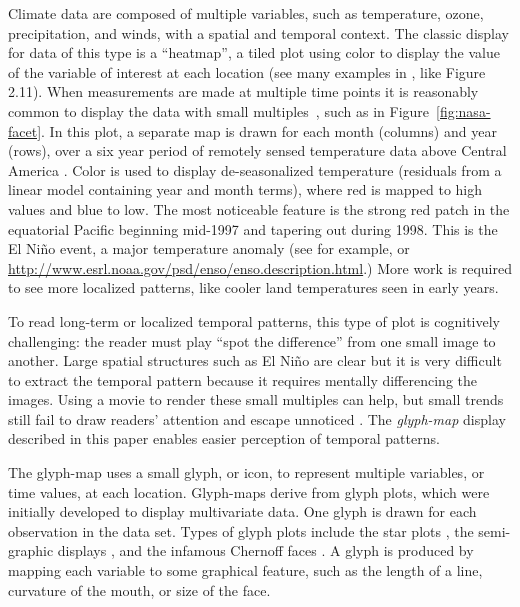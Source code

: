 \documentclass[oneside]{article}
\begin{document}
Climate data are composed of multiple variables, such as temperature, ozone, precipitation, and winds, with a spatial and temporal context. The classic display for data of this type is a ``heatmap'', a tiled plot using color to display the value of the variable of interest at each location (see many examples in \citet{IPCC}, like Figure 2.11). When measurements are made at multiple time points it is reasonably common to display the data with small multiples~\citep{tufte:2001}, such as in Figure~\ref{fig:nasa-facet}. In this plot, a separate map is drawn for each month (columns) and year (rows), over a six year period of remotely sensed temperature data above Central America \citep{murrell:2010}. Color is used to display de-seasonalized temperature (residuals from a linear model containing year and month terms), where red is mapped to high values and blue to low. The most noticeable feature is the strong red patch in the equatorial Pacific beginning mid-1997 and tapering out during 1998. This is the El Ni\~no event, a major temperature anomaly (see for example, \citet{trenberth} or \url{http://www.esrl.noaa.gov/psd/enso/enso.description.html}.) More work is required to see more localized patterns, like cooler land temperatures seen in early years.


To read long-term or localized temporal patterns, this type of plot is cognitively challenging: the reader must play ``spot the difference'' from one small image to another. Large spatial structures such as El Ni\~no are clear but it is very difficult to extract the temporal pattern because it requires mentally differencing the images. Using a movie to render these small multiples can help, but small trends still fail to draw readers' attention and escape unnoticed \citep{simons:gradual}. The \emph{glyph-map} display described in this paper enables easier perception of temporal patterns. 

The glyph-map uses a small glyph, or icon, to represent multiple variables, or time values, at each location. Glyph-maps derive from glyph plots, which were initially developed to display multivariate data. One glyph is drawn for each observation in the data set. Types of glyph plots include the star plots \citep{mayr:1877, FD01, kleiner:1981}, the semi-graphic displays \citep{anderson:1960}, and the infamous Chernoff faces \citep{chernoff:1973}. A glyph is produced by mapping each variable to some graphical feature, such as the length of a line, curvature of the mouth, or size of the face. 
\end{document}
